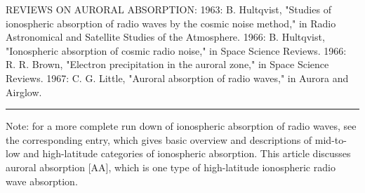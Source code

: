 


REVIEWS ON AURORAL ABSORPTION:
1963: B. Hultqvist, "Studies of ionospheric absorption of radio waves by the
cosmic noise method," in Radio Astronomical and Satellite Studies of the
Atmosphere.
1966: B. Hultqvist, "Ionospheric absorption of cosmic radio noise," in
Space Science Reviews.
1966: R. R. Brown, "Electron precipitation in the auroral zone," in
Space Science Reviews.
1967: C. G. Little, "Auroral absorption of radio waves," in Aurora and
Airglow.


\rule{\textwidth}{1pt}
Note: for a more complete run down of ionospheric absorption of radio
waves, see the corresponding entry, which gives basic overview and
descriptions of mid-to-low and high-latitude categories of ionospheric
absorption. This article discusses auroral absorption [AA], which is one
type of high-latitude ionospheric radio wave absorption.



